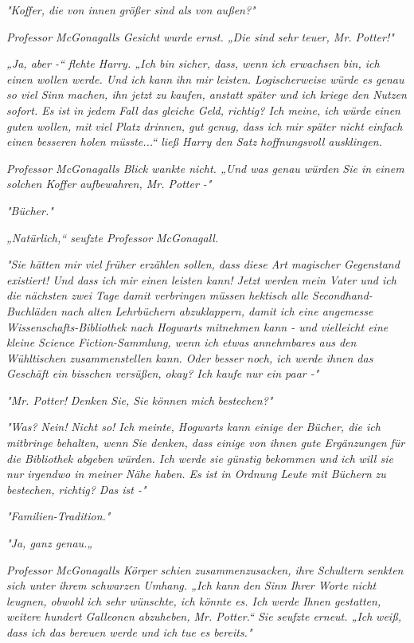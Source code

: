 {\emph{"Koffer, die von innen größer sind als von außen?"}

\emph{Professor McGonagalls Gesicht wurde ernst. „Die sind} \emph{\emph{sehr}} \emph{teuer, Mr. Potter!"}

\emph{„Ja, aber -“ flehte Harry. „Ich bin sicher, dass, wenn ich erwachsen bin, ich} \emph{einen wollen werde. Und ich} \emph{\emph{kann}} \emph{ihn mir leisten. Logischerweise würde es genau so viel Sinn machen, ihn jetzt zu kaufen, anstatt später und ich kriege den Nutzen sofort. Es ist in jedem Fall das gleiche Geld, richtig? Ich meine, ich} \emph{\emph{würde}} \emph{einen guten wollen, mit} \emph{\emph{viel}} \emph{Platz drinnen, gut genug, dass ich mir später nicht einfach einen besseren holen müsste...“ ließ Harry den Satz hoffnungsvoll ausklingen.}

\emph{Professor McGonagalls Blick wankte nicht. „Und was genau würden Sie in einem solchen Koffer} \emph{\emph{aufbewahren}, Mr. Potter -"}

\emph{"Bücher."}

\emph{„Natürlich,“ seufzte Professor McGonagall.}

\emph{"Sie hätten mir viel früher erzählen sollen, dass diese Art magischer Gegenstand existiert! Und dass ich mir einen leisten kann! Jetzt werden mein Vater und ich die nächsten zwei Tage damit verbringen müssen} \emph{\emph{hektisch}} \emph{alle Secondhand-Buchläden nach alten Lehrbüchern abzuklappern, damit ich eine angemesse Wissenschafts-Bibliothek nach Hogwarts mitnehmen kann - und vielleicht eine kleine Science Fiction-Sammlung, wenn ich etwas annehmbares aus den Wühltischen zusammenstellen kann. Oder besser noch, ich werde ihnen das Geschäft ein bisschen versüßen, okay? Ich kaufe nur ein paar -"}

\emph{"\emph{Mr. Potter!}} \emph{Denken Sie, Sie können mich} \emph{\emph{bestechen?}"}

\emph{"Was?} \emph{\emph{Nein!}} \emph{Nicht so! Ich meinte, Hogwarts kann einige der Bücher, die ich mitbringe behalten, wenn Sie denken, dass einige von ihnen gute Ergänzungen für die Bibliothek abgeben würden. Ich werde sie günstig bekommen und} \emph{\emph{ich}} \emph{will sie nur irgendwo in meiner Nähe haben. Es ist in Ordnung Leute mit} \emph{\emph{Büchern}} \emph{zu bestechen, richtig? Das ist -"}

\emph{"Familien-Tradition."}

\emph{"Ja, ganz genau.„}

\emph{Professor McGonagalls Körper schien zusammenzusacken, ihre Schultern senkten sich unter ihrem schwarzen Umhang. „Ich kann den Sinn Ihrer Worte nicht leugnen, obwohl ich sehr wünschte, ich könnte es. Ich werde Ihnen gestatten, weitere hundert Galleonen abzuheben, Mr. Potter.“ Sie seufzte erneut. „Ich} \emph{\emph{weiß}, dass ich das bereuen werde und ich tue es bereits."}

}
